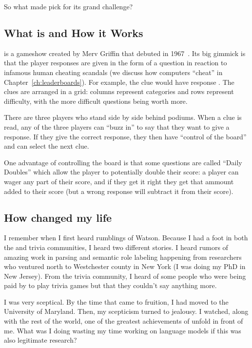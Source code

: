So what made  pick \jeopardy{} for its grand challenge?


\subsection{What \jeopardy{} is and How it Works}

\jeopardy{} is a gameshow created by Merv Griffin that debuted in
1967~\citep{griffin-03}.
%
Its big gimmick is that the player responses are given in the form of
a question in reaction to infamous human cheating scandals (we discuss how
computers ``cheat'' in Chapter~\ref{ch:leaderboards}).
%
For example, the clue
would have response .
%
%
The clues are arranged in a grid: columns represent categories and
rows represent difficulty, with the more difficult questions being
worth more.

There are three players who stand side by side behind podiums.
%
When a clue is read, any of the three players can ``buzz in'' to say
that they want to give a response.
%
If they give the correct response, they then have ``control of the
board'' and can select the next clue.

One advantage of controlling the board is that some questions are
called ``Daily Doubles'' which allow the player to potentially double
their score: a player can wager any part of their score, and if they
get it right they get that ammount added to their score (but a wrong
response will subtract it from their score).

\subsection{How \watson{} changed my life}

I remember when I first heard rumblings of Watson.
%
Because I had a foot in both the  and trivia communities, I
heard two different stories.
%
I heard rumors of amazing work in parsing and semantic role labeling
happening from researchers who ventured north to Westchester county in New
York (I was doing my PhD in New Jersey).
%
From the trivia community, I heard of some people who were being paid
by  to play trivia games but that they couldn't say anything
more.

I was very sceptical.
%
By the time that \watson{} came to fruition, I had moved to the
University of Maryland.
%
Then, my scepticism turned to jealousy.
%
I watched, along with the rest of the world, one of the greatest
achievements of  unfold in front of me.
%
What was I doing wasting my time working on language models if this was
also legitimate research?

